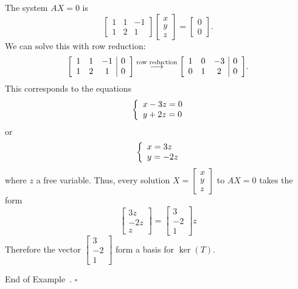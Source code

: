 \documentclass[10pt]{article}
\newenvironment{augmentedmatrix}[1] %
{\left[\begin{array}{#1}}
    {\end{array}\right]}
\theoremstyle{definition}
\newtheorem{example}[theorem]{Example}
\renewenvironment{example}
{\begin{oldexample}}
  {\par\smallskip\hfill   End of Example~\theexample. $\square$    \par\end{oldexample}}
\begin{document}
\begin{example}
  The system $AX=0$ is
  \begin{equation*}
    \begin{bmatrix}
      1&1&-1\\1&2&1
    \end{bmatrix}
    \begin{bmatrix}
      x\\y\\z
    \end{bmatrix}
    =
    \begin{bmatrix}
      0\\0
    \end{bmatrix}.
  \end{equation*}
  We can solve this with row reduction:
  \begin{equation*}
    \begin{augmentedmatrix}{ccc|c}
      1&1&-1&0\\
      1&2&1&0
    \end{augmentedmatrix}
    \overset{\text{row reduction}}{\longrightarrow}
    \begin{augmentedmatrix}{ccc|c}
      1&0&-3&0\\
      0&1&2&0
    \end{augmentedmatrix}.
  \end{equation*}
  This corresponds to the equations
  \begin{equation*}
    \left\{ \begin{array}{l@{}l} x-3z=0 \\ y+2z=0 \end{array}\right.
  \end{equation*}
  or
  \begin{equation*}
    \left\{ \begin{array}{l@{}l} x=3z \\ y=-2z \end{array}\right.
  \end{equation*}
  where $z$ a free variable. Thus, every solution $X=
  \begin{bmatrix}
    x\\y\\z
  \end{bmatrix}
  $ to $AX=0$ takes the form
  \begin{equation*}
    \begin{bmatrix}
      3z\\-2z\\z
    \end{bmatrix} =
    \begin{bmatrix}
      3\\-2\\1
    \end{bmatrix}z
  \end{equation*}
  Therefore the vector $
  \begin{bmatrix}
    3\\-2\\1
  \end{bmatrix}
  $ form a basis for $\ker(T)$.
\end{example}
\end{document}
